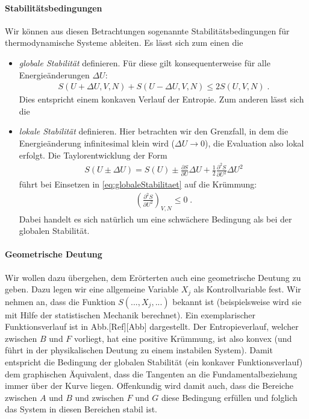 \paragraph*{Stabilitätsbedingungen} Wir können aus diesen Betrachtungen sogenannte Stabilitätsbedingungen für thermodynamische Systeme ableiten.
Es lässt sich zum einen die 
\begin{itemize}
    \item \emph{globale Stabilität} definieren. Für diese gilt konsequenterweise für alle Energieänderungen $\Delta U$:
    \begin{align}
        \label{eq:globaleStabilitaet}
        \boxed{S(U+\Delta U,V,N)+S(U-\Delta U,V,N)\leq 2S(U,V,N)}\;.
    \end{align}
    Dies entspricht einem konkaven Verlauf der Entropie. Zum anderen lässt sich die 
    \item \emph{lokale Stabilität} definieren. Hier betrachten wir den Grenzfall, in dem die Energieänderung infinitesimal klein wird ($\Delta U\rightarrow 0$), die Evaluation also lokal erfolgt.   
    Die Taylorentwicklung der Form
    \begin{align*}
        S(U\pm\Delta U)=S(U)\pm \frac{\partial S}{\partial U}\Delta U+\frac{1}{2}\frac{\partial^2S}{\partial U^2}\Delta U^2
    \end{align*}
    führt bei Einsetzen in \ref{eq:globaleStabilitaet} auf die Krümmung:
    \begin{align}
		\label{eq:lokaleStabilitaet}
        \boxed{\left(\frac{\partial^2S}{\partial U^2}\right)_{V,N}\leq 0}\;.
    \end{align}
    Dabei handelt es sich natürlich um eine schwächere Bedingung als bei der globalen Stabilität.
\end{itemize}
\paragraph*{Geometrische Deutung}
Wir wollen dazu übergehen, dem Erörterten auch eine geometrische Deutung zu geben. Dazu legen wir eine allgemeine Variable $X_j$ als Kontrollvariable fest.
Wir nehmen an, dass die Funktion $S(...,X_j,...)$ bekannt ist (beispielsweise wird sie mit Hilfe der statistischen Mechanik berechnet). Ein exemplarischer Funktionsverlauf ist in Abb.[Ref][Abb] dargestellt. Der Entropieverlauf, welcher zwischen $B$ und $F$ vorliegt, hat eine positive Krümmung, ist also konvex (und führt in der physikalischen Deutung zu einem instabilen System). Damit entspricht die Bedingung der globalen Stabilität (ein konkaver Funktionsverlauf) dem graphischen Äquivalent, dass die Tangenten an die Fundamentalbeziehung immer über der Kurve liegen. Offenkundig wird damit auch, dass die Bereiche zwischen $A$ und $B$ und zwischen $F$ und $G$ diese Bedingung erfüllen und folglich das System in diesen Bereichen stabil ist.

